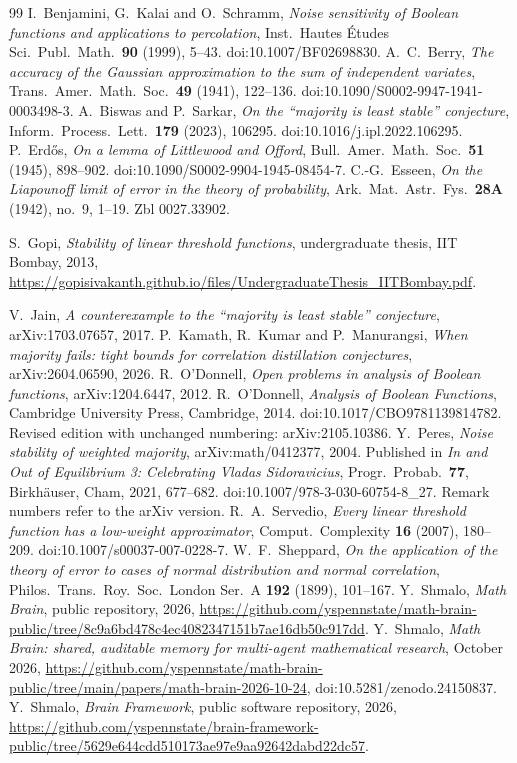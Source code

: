 \documentclass[11pt]{amsart}
\theoremstyle{remark}
\numberwithin{equation}{section}
\begin{document}
\begin{thebibliography}{99}
 I.~Benjamini, G.~Kalai and O.~Schramm, \emph{Noise sensitivity of Boolean functions and applications to percolation}, Inst.\ Hautes \'Etudes Sci.\ Publ.\ Math.\ \textbf{90} (1999), 5--43. doi:10.1007/BF02698830.
 A.~C.~Berry, \emph{The accuracy of the Gaussian approximation to the sum of independent variates}, Trans.\ Amer.\ Math.\ Soc.\ \textbf{49} (1941), 122--136. doi:10.1090/S0002-9947-1941-0003498-3.
 A.~Biswas and P.~Sarkar, \emph{On the ``majority is least stable'' conjecture}, Inform.\ Process.\ Lett.\ \textbf{179} (2023), 106295. doi:10.1016/j.ipl.2022.106295.
 P.~Erd\H{o}s, \emph{On a lemma of Littlewood and Offord}, Bull.\ Amer.\ Math.\ Soc.\ \textbf{51} (1945), 898--902. doi:10.1090/S0002-9904-1945-08454-7.
 C.-G.~Esseen, \emph{On the Liapounoff limit of error in the theory of probability}, Ark.\ Mat.\ Astr.\ Fys.\ \textbf{28A} (1942), no.~9, 1--19. Zbl 0027.33902.

 S.~Gopi, \emph{Stability of linear threshold functions}, undergraduate thesis, IIT Bombay, 2013, \url{https://gopisivakanth.github.io/files/UndergraduateThesis_IITBombay.pdf}.

 V.~Jain, \emph{A counterexample to the ``majority is least stable'' conjecture}, arXiv:1703.07657, 2017.
 P.~Kamath, R.~Kumar and P.~Manurangsi, \emph{When majority fails: tight bounds for correlation distillation conjectures}, arXiv:2604.06590, 2026.
 R.~O'Donnell, \emph{Open problems in analysis of Boolean functions}, arXiv:1204.6447, 2012.
 R.~O'Donnell, \emph{Analysis of Boolean Functions}, Cambridge University Press, Cambridge, 2014. doi:10.1017/CBO9781139814782. Revised edition with unchanged numbering: arXiv:2105.10386.
 Y.~Peres, \emph{Noise stability of weighted majority}, arXiv:math/0412377, 2004. Published in \emph{In and Out of Equilibrium 3: Celebrating Vladas Sidoravicius}, Progr.\ Probab.\ \textbf{77}, Birkh\"auser, Cham, 2021, 677--682. doi:10.1007/978-3-030-60754-8\_27. Remark numbers refer to the arXiv version.
 R.~A.~Servedio, \emph{Every linear threshold function has a low-weight approximator}, Comput.\ Complexity \textbf{16} (2007), 180--209. doi:10.1007/s00037-007-0228-7.
 W.~F.~Sheppard, \emph{On the application of the theory of error to cases of normal distribution and normal correlation}, Philos.\ Trans.\ Roy.\ Soc.\ London Ser.\ A \textbf{192} (1899), 101--167.
 Y.~Shmalo, \emph{Math Brain}, public repository, 2026, \url{https://github.com/yspennstate/math-brain-public/tree/8c9a6bd478c4ec4082347151b7ae16db50c917dd}.
 Y.~Shmalo, \emph{Math Brain: shared, auditable memory for multi-agent mathematical research}, October 2026, \url{https://github.com/yspennstate/math-brain-public/tree/main/papers/math-brain-2026-10-24}, doi:10.5281/zenodo.24150837.
 Y.~Shmalo, \emph{Brain Framework}, public software repository, 2026, \url{https://github.com/yspennstate/brain-framework-public/tree/5629e644cdd510173ae97e9aa92642dabd22dc57}.
\end{thebibliography}
\end{document}
